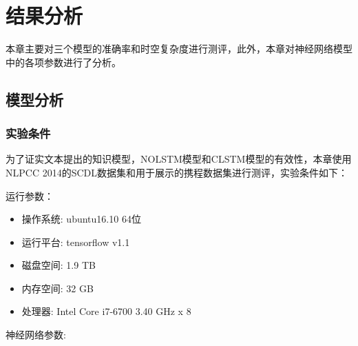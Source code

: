 \chapter{结果分析}\thispagestyle{fancy}
本章主要对三个模型的准确率和时空复杂度进行测评，此外，本章对神经网络模型中的各项参数进行了分析。
\section{模型分析} \label{sec:modeleval}
\subsection{实验条件}
为了证实文本提出的知识模型，NOLSTM模型和CLSTM模型的有效性，本章使用NLPCC 2014的SCDL数据集和用于展示的携程数据集进行测评，实验条件如下：\par
运行参数：\par
\begin{itemize}
\item 操作系统: ubuntu16.10 64位
\item 运行平台: tensorflow v1.1
\item 磁盘空间: 1.9 TB
\item 内存空间: 32 GB
\item 处理器: Intel Core i7-6700 3.40 GHz x 8
\end{itemize}
\par 
神经网络参数:


